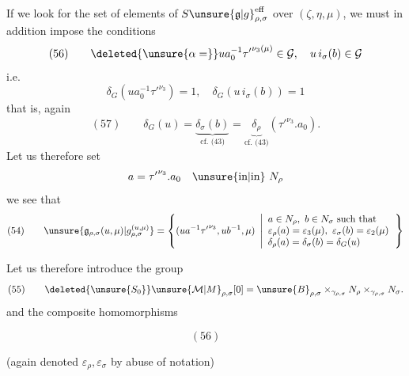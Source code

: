If we look for the set of elements of
\(S\unsure{\mathfrak{g}|g}_{\rho,\sigma}^{\mathrm{eff}}\)
over \((\zeta,\eta,\mu)\), we must in addition
impose the conditions
\[
(56)\qquad
\deleted{\unsure{\alpha=}}ua_0^{-1}{\tau'}^{\nu_3(\mu)}\in\mathcal{G},
\quad u\,i_\sigma(b)\in\mathcal{G}
\]
i.e.
\[
\delta_G(ua_0^{-1}{\tau'}^{\nu_3})=1,\quad
\delta_G(u\,i_\sigma(b))=1
\]
that is, again
\[
(57)\qquad
\delta_G(u)=
\underbrace{\delta_\sigma(b)}_{\text{cf. (43)}}
=
\underbrace{\delta_\rho}_{\text{cf. (43)}}
({\tau'}^{\nu_3}.a_0).
\]
Let us therefore set
\[
a={\tau'}^{\nu_3}.a_0\quad\text{\unsure{in|in}}\ N_\rho
\]
we see that
\[
(54)\qquad
\unsure{\mathfrak{g}_{\rho,\sigma}(u,\mu)|g_{\rho,\sigma}^{(u,\mu)}}
=
\left\{(ua^{-1}{\tau'}^{\nu_3},ub^{-1},\mu)\ \left|
\begin{array}{l}
a\in N_\rho,\ b\in N_\sigma\ \text{such that}\\
\varepsilon_\rho(a)=\varepsilon_3(\mu),\
\varepsilon_\sigma(b)=\varepsilon_2(\mu)\\
\delta_\rho(a)=\delta_\sigma(b)=\delta_G(u)
\end{array}\right.\right\}
\]

Let us therefore introduce the group
\[
(55)\qquad
\deleted{\unsure{S_0}}
\unsure{\mathcal{M}|M}_{\rho,\sigma}[0]
=\unsure{B}_{\rho,\sigma}
\times_{\gamma_{\rho,\sigma}}N_\rho
\times_{\gamma_{\rho,\sigma}}N_\sigma.
\]
and the composite homomorphisms
\begin{samepage}
\[
(56)
\]
\end{samepage}
(again denoted \(\varepsilon_\rho,\varepsilon_\sigma\)
by abuse of notation)

